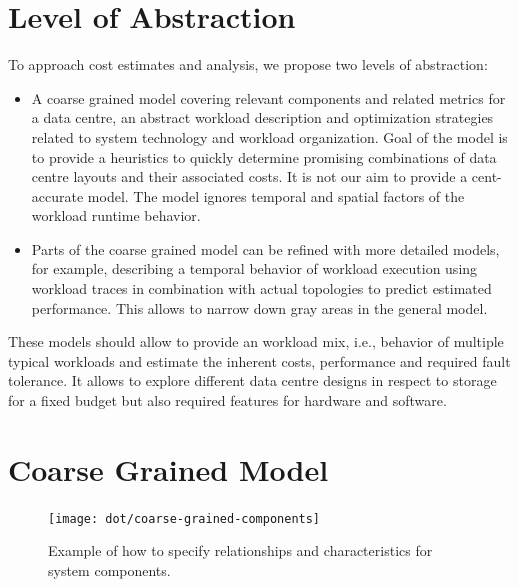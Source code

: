 \documentclass{../../template/esiwace-report}
\begin{document}
\section{Level of Abstraction}
\label{sec:modeling/level of abstraction}

To approach cost estimates and analysis, we propose two levels of abstraction:

\begin{itemize}
	\item A coarse grained model covering relevant components and related metrics for a data centre, an abstract workload description and optimization strategies related to system technology and workload organization.
	Goal of the model is to provide a heuristics to quickly determine promising combinations of data centre layouts and their associated costs. It is not our aim to provide a cent-accurate model.
	The model ignores temporal and spatial factors of the workload runtime behavior.
	\item Parts of the coarse grained model can be refined with more detailed models, for example, describing a temporal behavior of workload execution using workload traces in combination with actual topologies to predict estimated performance. This allows to narrow down gray areas in the general model.
\end{itemize}

These models should allow to provide an workload mix, i.e., behavior of multiple typical workloads and estimate the inherent costs, performance and required fault tolerance.
It allows to explore different data centre designs in respect to storage for a fixed budget but also required features for hardware and software.



\section{Coarse Grained Model}

\begin{figure}
	\centering
	\texttt{[image: dot/coarse-grained-components]}
	\caption{Example of how to specify relationships and characteristics for system components.}
	\label{fig:abstract + key-value}
\end{figure}
\end{document}
